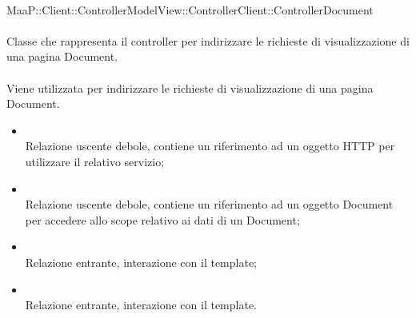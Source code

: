 \\
MaaP::Client::ControllerModelView::ControllerClient::ControllerDocument\\
\\
Classe che rappresenta il controller per indirizzare le richieste di visualizzazione di una pagina Document.\\
\\
Viene utilizzata per indirizzare le richieste di visualizzazione di una pagina Document.\\
\begin{itemize}
\item{}\\
Relazione uscente debole, contiene un riferimento ad un oggetto HTTP per utilizzare il relativo servizio;
\item{}\\
Relazione uscente debole, contiene un riferimento ad un oggetto Document per accedere allo scope relativo ai dati di un Document;
\item{}\\
Relazione entrante, interazione con il template;
\item{}\\
Relazione entrante, interazione con il template.
\end{itemize}


